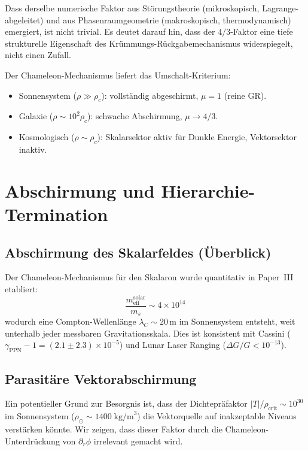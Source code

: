 \documentclass[aps,prd,twocolumn,superscriptaddress,nofootinbib]{revtex4-2}
\begin{document}
Dass derselbe numerische Faktor aus St\"orungstheorie (mikroskopisch, Lagrange-abgeleitet) und aus Phasenraumgeometrie (makroskopisch, thermodynamisch) emergiert, ist nicht trivial. Es deutet darauf hin, dass der $4/3$-Faktor eine tiefe strukturelle Eigenschaft des Kr\"ummungs-R\"uckgabemechanismus widerspiegelt, nicht einen Zufall.

Der Chameleon-Mechanismus liefert das Umschalt-Kriterium:
\begin{itemize}
\item Sonnensystem ($\rho \gg \rho_c$): vollst\"andig abgeschirmt, $\mu = 1$ (reine GR).
\item Galaxie ($\rho \sim 10^2\rho_c$): schwache Abschirmung, $\mu \to 4/3$.
\item Kosmologisch ($\rho \sim \rho_c$): Skalarsektor aktiv f\"ur Dunkle Energie, Vektorsektor inaktiv.
\end{itemize}


\section{Abschirmung und Hierarchie-Termination}
\label{sec:screening}

\subsection{Abschirmung des Skalarfeldes (\"Uberblick)}

Der Chameleon-Mechanismus f\"ur den Skalaron wurde quantitativ in Paper~III etabliert:
\begin{equation}
\frac{m_{\mathrm{eff}}^{\mathrm{solar}}}{m_s} \sim 4 \times 10^{14}
\end{equation}
wodurch eine Compton-Wellenl\"ange $\lambda_C \sim 20$\,m im Sonnensystem entsteht, weit unterhalb jeder messbaren Gravitationsskala. Dies ist konsistent mit Cassini ($\gamma_{\mathrm{PPN}} - 1 = (2.1 \pm 2.3) \times 10^{-5}$) und Lunar Laser Ranging ($\Delta G/G < 10^{-13}$).

\subsection{Parasit\"are Vektorabschirmung}
\label{sec:parasitic}

Ein potentieller Grund zur Besorgnis ist, dass der Dichtepr\"afaktor $|T|/\rho_{\mathrm{crit}} \sim 10^{30}$ im Sonnensystem ($\rho_\odot \sim 1400\;\mathrm{kg/m}^3$) die Vektorquelle auf inakzeptable Niveaus verst\"arken k\"onnte. Wir zeigen, dass dieser Faktor durch die Chameleon-Unterdr\"uckung von $\partial_r\phi$ irrelevant gemacht wird.
\end{document}
